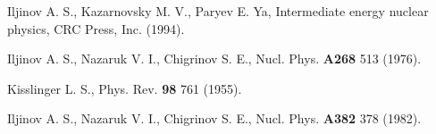 \begin{thebibliography}{599}

 Iljinov A. S., Kazarnovsky M. V., Paryev E. Ya, 
Intermediate energy nuclear physics, CRC Press, Inc. (1994).

 Iljinov A. S., Nazaruk V. I., Chigrinov S. E., Nucl. Phys. {\bf
A268} 513 (1976).

 Kisslinger L. S., Phys. Rev. {\bf 98} 761 (1955).

 Iljinov A. S., Nazaruk V. I., Chigrinov S. E., Nucl. Phys. {\bf
A382} 378 (1982).

\end{thebibliography}
